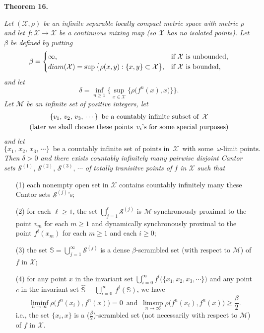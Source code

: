 \documentclass[12pt]{article}
\begin{document}
\noindent
{\bf Theorem 16.}
{\it Let $(\mathcal X, \rho)$ be an infinite separable locally compact metric space with metric $\rho$ and let $f : \mathcal X \rightarrow \mathcal X$ be a continuous mixing map (so $\mathcal X$ has no isolated points).  Let $\beta$ be defined by putting
$$
\beta =  \begin{cases}
               \infty, & \text{if $\mathcal X$ is unbounded}, \cr
               diam(\mathcal X) = \sup\big\{ \rho(x, y): \{ x, y \} \subset \mathcal X \big\}, & \text{if $\mathcal X$ is bounded}, \cr
       \end{cases}
$$
and let 
$$\delta = \inf_{n \ge 1} \bigg\{ \sup_{x \in \mathcal X} \big\{ \rho\big(f^n(x), x\big) \big\} \bigg\}.$$ 
Let $\mathcal M$ be an infinite set of positive integers, let 
\begin{multline*}
$$
\{ v_1, \, v_2, \, v_3, \, \cdots \} \,\,\, \text{be a countably infinite subset of} \,\,\, \mathcal X \\ \text{(later we shall choose these points} \,\,\, v_i\text{'s for some special purposes)}
$$
\end{multline*} 
and let
$$
\{ x_1, \, x_2, \, x_3, \, \cdots \} \,\,\, \text{be a countably infinite set of points in} \,\,\, \mathcal X \,\,\, \text{with some} \,\,\, \omega\text{-limit points}
.$$  
Then $\delta > 0$ and there exists countably infinitely many pairwise disjoint Cantor sets $\mathcal S^{(1)}, \, \mathcal S^{(2)}, \, \mathcal S^{(3)}, \, \cdots$ of totally tranisitve points of $f$ in $\mathcal X$ such that 
\begin{itemize}
\item[{\rm (1)}]
each nonempty open set in $\mathcal X$ contains countably infinitely many these Cantor sets $\mathcal S^{(j)}$'s;

\item[{\rm (2)}]
for each $\ell \ge 1$, the set $\bigcup_{j=1}^\ell \mathcal S^{(j)}$ is $\mathcal M$-synchronously proximal to the point $v_m$ for each $m \ge 1$ and dynamically synchronously proximal to the point $f^i(x_m)$ for each $m \ge 1$ and each $i \ge 0$;

\item[{\rm (3)}]
the set $\mathbb S = \bigcup_{j=1}^\infty \mathcal S^{(j)}$ is a dense $\beta$-scrambled set (with respect to $\mathcal M$) of $f$ in $\mathcal X$;

\item[{\rm (4)}]
for any point $x$ in the invariant set $\bigcup_{i=0}^\infty f^i\big(\{x_1, x_2, x_3, \cdots\}\big)$ and any point $c$ in the invariant set $\widehat {\mathbb S} = \bigcup_{i=0}^\infty \, f^i(\mathbb S)$, 
we have 
$$\liminf_{n \to \infty} \rho\big(f^n(x_i), f^n(x)\big) = 0 \,\,\, \text{and} \,\,\, \limsup_{n \to \infty} \rho\big(f^n(x_i), f^n(x)\big) \ge \frac \beta2.$$
i.e., the set $\{ x_i, x \}$ is a ($\frac {\beta}2$)-scrambled set (not necessarily with respect to $\mathcal M$) of $f$ in $\mathcal X$.


\end{itemize}}
\end{document}
